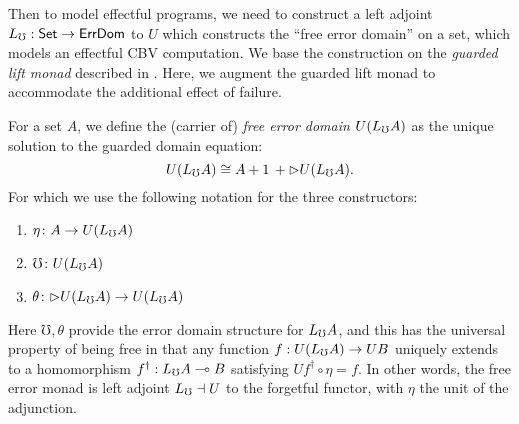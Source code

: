 
Then to model effectful programs, we need to construct a left adjoint
$L_\mho : \mathsf{Set} \to \mathsf{ErrDom}$ to $U$ which constructs the ``free error
domain'' on a set, which models an effectful CBV computation.
We base the construction on the \emph{guarded
lift monad} described in \cite{mogelberg-paviotti2016}. Here, we augment the
guarded lift monad to accommodate the additional effect of failure.
\begin{definition}
  For a set $A$, we define the (carrier of) \emph{free error domain} $U(L_\mho A)$ as the unique solution to the guarded domain equation:
  \[ U(L_\mho A) \cong A + 1\, + {{\vartriangleright}} U(L_\mho A). \]
  For which we use the following notation for the three constructors:
  \begin{enumerate}
  \item $\eta \colon A \to U(L_\mho A)$
  \item $\mho \colon U(L_\mho A)$
  \item $\theta \colon {{\vartriangleright}} U(L_\mho A) \to U(L_\mho A)$
  \end{enumerate}
  Here $\mho, \theta$ provide the error domain structure for $L_\mho A$,
  and this has the universal property of being free in that any
  function $f : U(L_\mho A) \to UB$ uniquely extends to a homomorphism
  $f^\dagger : L_\mho A \multimap B$ satisfying $Uf^\dagger \circ \eta =
  f$. In other words, the free error monad is left adjoint $L_\mho \dashv
  U$ to the forgetful functor, with $\eta$ the unit of the adjunction.
\end{definition}

